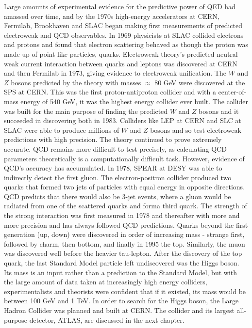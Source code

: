 Large amounts of experimental evidence for the predictive power of QED had amassed over time, and by the 1970s high-energy accelerators at CERN, Fermilab, Brookhaven and SLAC began making first measurements of predicted electroweak and QCD observables. In 1969 physicists at SLAC collided electrons and protons and found that electron scattering behaved as though the proton was made up of point-like particles, quarks. Electroweak theory's predicted neutral weak current interaction between quarks and leptons was discovered at CERN and then Fermilab in 1973, giving evidence to electroweak unification. The $W$ and $Z$ bosons predicted by the theory with masses $\approx$ 80 GeV were discovered at the SPS at CERN. This was the first proton-antiproton collider and with a center-of-mass energy of 540 GeV, it was the highest energy collider ever built. The collider was built for the main purpose of finding the predicted $W$ and $Z$ bosons and it succeeded in discovering both in 1983. Colliders like LEP at CERN and SLC at SLAC were able to produce millions of $W$ and $Z$ bosons and so test electroweak predictions with high precision. The theory continued to prove extremely accurate. QCD remains more difficult to test precisely, as calculating QCD parameters theoretically is a computationally difficult task. However, evidence of QCD's accuracy has accumulated. In 1978, SPEAR at DESY was able to indirectly detect the first gluon. The electron-positron collider produced two quarks that formed two jets of particles with equal energy in opposite directions. QCD predicts that there would also be 3-jet events, where a gluon would be radiated from one of the scattered quarks and forma third quark. The strength of the strong interaction was first measured in 1978 and thereafter with more and more precision and has always followed QCD predictions. Quarks beyond the first generation (up, down) were discovered in order of increasing mass - strange first, followed by charm, then bottom, and finally in 1995 the top. Similarly, the muon was discovered well before the heavier tau-lepton. After the discovery of the top quark, the last Standard Model particle left undiscovered was the Higgs boson. Its mass is an input rather than a prediction to the Standard Model, but with the large amount of data taken at increasingly high energy colliders, experimentalists and theorists were confident that if it existed, its mass would be between 100 GeV and 1 TeV. In order to search for the Higgs boson, the Large Hadron Collider was planned and built at CERN. The collider and its largest all-purpose detector, ATLAS, are discussed in the next chapter. 

